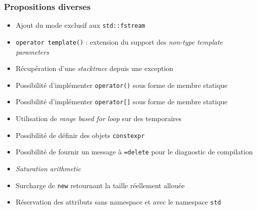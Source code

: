 \documentclass[C++.tex]{subfiles}
\begin{document}
\begin{frame}[fragile]
	\frametitle{Propositions diverses}
	\begin{itemize}
		\item Ajout du mode exclusif aux \lstinline|std::fstream|
		\item \lstinline|operator template()| : extension du support des \textit{non-type template parameters}
		\item Récupération d'une \textit{stacktrace} depuis une exception
		\item Possibilité d'implémenter \lstinline|operator()| sous forme de membre statique
		\item Possibilité d'implémenter \lstinline|operator[]| sous forme de membre statique
		\item Utilisation de \textit{range based for loop} sur des temporaires
		\item Possibilité de définir des objets \lstinline|constexpr|
		\item Possibilité de fournir un message à \lstinline|=delete| pour le diagnostic de compilation
		\item \textit{Saturation arithmetic}
		

		\item Surcharge de \lstinline|new| retournant la taille réellement allouée
		\item Réservation des attributs sans namespace et avec le namespace \lstinline|std|


	\end{itemize}
\end{frame}
\end{document}
